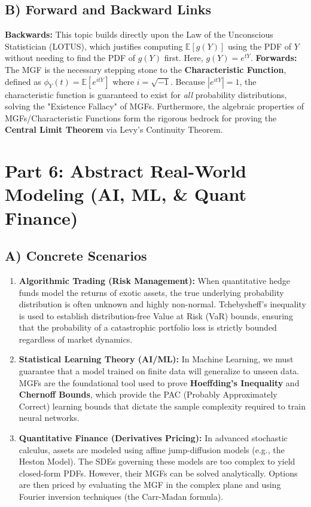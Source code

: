 \documentclass[11pt, a4paper]{article}
\theoremstyle{definition}
\theoremstyle{remark}
\newcommand{\E}{\mathbb{E}}
\begin{document}
\subsection{B) Forward and Backward Links}
\textbf{Backwards:} This topic builds directly upon the Law of the Unconscious Statistician (LOTUS), which justifies computing $\E[g(Y)]$ using the PDF of $Y$ without needing to find the PDF of $g(Y)$ first. Here, $g(Y) = e^{tY}$.
\textbf{Forwards:} The MGF is the necessary stepping stone to the \textbf{Characteristic Function}, defined as $\phi_Y(t) = \E[e^{itY}]$ where $i = \sqrt{-1}$. Because $|e^{itY}| = 1$, the characteristic function is guaranteed to exist for \textit{all} probability distributions, solving the "Existence Fallacy" of MGFs. Furthermore, the algebraic properties of MGFs/Characteristic Functions form the rigorous bedrock for proving the \textbf{Central Limit Theorem} via Levy's Continuity Theorem.

\section{Part 6: Abstract Real-World Modeling (AI, ML, \& Quant Finance)}

\subsection{A) Concrete Scenarios}
\begin{enumerate}
    \item \textbf{Algorithmic Trading (Risk Management):} When quantitative hedge funds model the returns of exotic assets, the true underlying probability distribution is often unknown and highly non-normal. Tchebysheff's inequality is used to establish distribution-free Value at Risk (VaR) bounds, ensuring that the probability of a catastrophic portfolio loss is strictly bounded regardless of market dynamics.
    \item \textbf{Statistical Learning Theory (AI/ML):} In Machine Learning, we must guarantee that a model trained on finite data will generalize to unseen data. MGFs are the foundational tool used to prove \textbf{Hoeffding's Inequality} and \textbf{Chernoff Bounds}, which provide the PAC (Probably Approximately Correct) learning bounds that dictate the sample complexity required to train neural networks.
    \item \textbf{Quantitative Finance (Derivatives Pricing):} In advanced stochastic calculus, assets are modeled using affine jump-diffusion models (e.g., the Heston Model). The SDEs governing these models are too complex to yield closed-form PDFs. However, their MGFs can be solved analytically. Options are then priced by evaluating the MGF in the complex plane and using Fourier inversion techniques (the Carr-Madan formula).
\end{enumerate}
\end{document}
